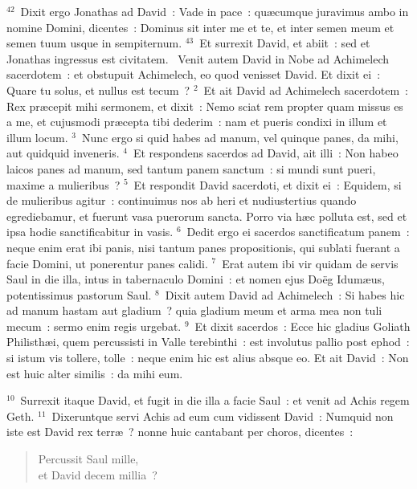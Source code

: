 ${}^{42}$~Dixit ergo Jonathas ad David~: Vade in pace~: qu\ae cumque juravimus ambo in nomine Domini, dicentes~: Dominus sit inter me et te, et inter semen meum et semen tuum usque in sempiternum.
${}^{43}$~Et surrexit David, et abiit~: sed et Jonathas ingressus est civitatem.
~Venit autem David in Nobe ad Achimelech sacerdotem~: et obstupuit Achimelech, eo quod venisset David. Et dixit ei~: Quare tu solus, et nullus est tecum~?
${}^{2}$~Et ait David ad Achimelech sacerdotem~: Rex pr\ae cepit mihi sermonem, et dixit~: Nemo sciat rem propter quam missus es a me, et cujusmodi pr\ae cepta tibi dederim~: nam et pueris condixi in illum et illum locum.
${}^{3}$~Nunc ergo si quid habes ad manum, vel quinque panes, da mihi, aut quidquid inveneris.
${}^{4}$~Et respondens sacerdos ad David, ait illi~: Non habeo laicos panes ad manum, sed tantum panem sanctum~: si mundi sunt pueri, maxime a mulieribus~?
${}^{5}$~Et respondit David sacerdoti, et dixit ei~: Equidem, si de mulieribus agitur~: continuimus nos ab heri et nudiustertius quando egrediebamur, et fuerunt vasa puerorum sancta. Porro via h\ae c polluta est, sed et ipsa hodie sanctificabitur in vasis.
${}^{6}$~Dedit ergo ei sacerdos sanctificatum panem~: neque enim erat ibi panis, nisi tantum panes propositionis, qui sublati fuerant a facie Domini, ut ponerentur panes calidi.
${}^{7}$~Erat autem ibi vir quidam de servis Saul in die illa, intus in tabernaculo Domini~: et nomen ejus Do\"eg Idum\ae us, potentissimus pastorum Saul.
${}^{8}$~Dixit autem David ad Achimelech~: Si habes hic ad manum hastam aut gladium~? quia gladium meum et arma mea non tuli mecum~: sermo enim regis urgebat.
${}^{9}$~Et dixit sacerdos~: Ecce hic gladius Goliath Philisth\ae i, quem percussisti in Valle terebinthi~: est involutus pallio post ephod~: si istum vis tollere, tolle~: neque enim hic est alius absque eo. Et ait David~: Non est huic alter similis~: da mihi eum.


${}^{10}$~Surrexit itaque David, et fugit in die illa a facie Saul~: et venit ad Achis regem Geth.
${}^{11}$~Dixeruntque servi Achis ad eum cum vidissent David~: Numquid non iste est David rex terr\ae~? nonne huic cantabant per choros, dicentes~: \begin{flushleft}\begin{verse}Percussit Saul mille,\\ et David decem millia~?\end{verse}\end{flushleft}


